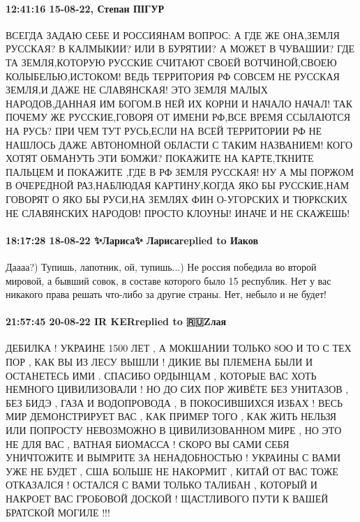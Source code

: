  
 
 
 
 

\paragraph{12:41:16 15-08-22, Степан ПІГУР}

ВСЕГДА ЗАДАЮ СЕБЕ И РОССИЯНАМ ВОПРОС: А ГДЕ ЖЕ ОНА,ЗЕМЛЯ
РУССКАЯ? В КАЛМЫКИИ? ИЛИ В БУРЯТИИ? А МОЖЕТ В ЧУВАШИИ? ГДЕ ТА ЗЕМЛЯ,КОТОРУЮ
РУССКИЕ СЧИТАЮТ СВОЕЙ ВОТЧИНОЙ,СВОЕЮ КОЛЫБЕЛЬЮ,ИСТОКОМ! ВЕДЬ ТЕРРИТОРИЯ РФ
СОВСЕМ НЕ РУССКАЯ ЗЕМЛЯ,И ДАЖЕ НЕ СЛАВЯНСКАЯ! ЭТО ЗЕМЛЯ МАЛЫХ НАРОДОВ,ДАННАЯ ИМ
БОГОМ.В НЕЙ ИХ КОРНИ И НАЧАЛО НАЧАЛ! ТАК ПОЧЕМУ ЖЕ РУССКИЕ,ГОВОРЯ ОТ ИМЕНИ
РФ,ВСЕ ВРЕМЯ ССЫЛАЮТСЯ НА РУСЬ? ПРИ ЧЕМ ТУТ РУСЬ,ЕСЛИ НА ВСЕЙ ТЕРРИТОРИИ РФ НЕ
НАШЛОСЬ ДАЖЕ АВТОНОМНОЙ ОБЛАСТИ С ТАКИМ НАЗВАНИЕМ! КОГО ХОТЯТ ОБМАНУТЬ ЭТИ
БОМЖИ? ПОКАЖИТЕ НА КАРТЕ,ТКНИТЕ ПАЛЬЦЕМ И ПОКАЖИТЕ ,ГДЕ В РФ ЗЕМЛЯ РУССКАЯ! НУ
А МЫ ПОРЖОМ В ОЧЕРЕДНОЙ РАЗ,НАБЛЮДАЯ КАРТИНУ,КОГДА ЯКО БЫ РУССКИЕ,НАМ ГОВОРЯТ О
ЯКО БЫ РУСИ,НА ЗЕМЛЯХ ФИН О-УГОРСКИХ И ТЮРКСКИХ НЕ СЛАВЯНСКИХ НАРОДОВ! ПРОСТО
КЛОУНЫ! ИНАЧЕ И НЕ СКАЖЕШЬ!

\paragraph{18:17:28 18-08-22 ✨Лариса✨ Ларисаreplied to Иаков}

Даааа?) Тупишь, лапотник, ой, тупишь...) Не россия победила во второй мировой,
а бывший совок, в составе которого было 15 республик. Нет у вас никакого права
решать что-либо за другие страны. Нет, небыло и не будет!

\paragraph{21:57:45 20-08-22 IR KERreplied to 🇷🇺Zлая}

ДЕБИЛКА ! УКРАИНЕ 1500 ЛЕТ , А МОКШАНИИ ТОЛЬКО 8ОО И ТО С ТЕХ ПОР , КАК ВЫ ИЗ ЛЕСУ ВЫШЛИ ! ДИКИЕ ВЫ ПЛЕМЕНА БЫЛИ И ОСТАНЕТЕСЬ ИМИ . СПАСИБО ОРДЫНЦАМ , КОТОРЫЕ ВАС ХОТЬ НЕМНОГО ЦИВИЛИЗОВАЛИ !
НО ДО СИХ ПОР ЖИВЁТЕ БЕЗ УНИТАЗОВ , БЕЗ БИДЭ , ГАЗА И ВОДОПРОВОДА , В ПОКОСИВШИХСЯ ИЗБАХ ! ВЕСЬ МИР ДЕМОНСТРИРУЕТ ВАС , КАК ПРИМЕР ТОГО , КАК ЖИТЬ НЕЛЬЗЯ ИЛИ
ПОПРОСТУ НЕВОЗМОЖНО В ЦИВИЛИЗОВАННОМ МИРЕ , НО ЭТО НЕ ДЛЯ ВАС , ВАТНАЯ БИОМАССА !
СКОРО ВЫ САМИ СЕБЯ УНИЧТОЖИТЕ И ВЫМРИТЕ
ЗА НЕНАДОБНОСТЬЮ ! УКРАИНЫ С ВАМИ УЖЕ НЕ БУДЕТ , США БОЛЬШЕ НЕ НАКОРМИТ , КИТАЙ ОТ ВАС ТОЖЕ ОТКАЗАЛСЯ ! ОСТАЛСЯ С ВАМИ ТОЛЬКО ТАЛИБАН , КОТОРЫЙ И НАКРОЕТ ВАС ГРОБОВОЙ ДОСКОЙ ! ЩАСТЛИВОГО ПУТИ К ВАШЕЙ БРАТСКОЙ МОГИЛЕ !!!

